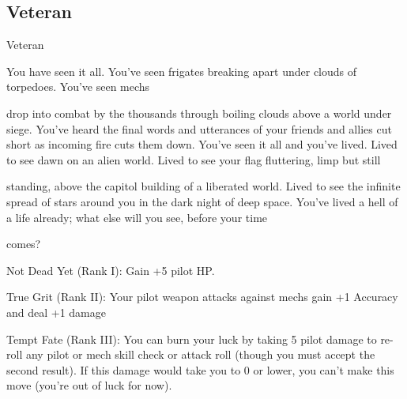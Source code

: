 \subsection{Veteran}

                                                     Veteran  

You have seen it all. You’ve seen frigates breaking apart under clouds of torpedoes. You’ve seen mechs  

drop into combat by the thousands through boiling clouds above a world under siege. You’ve heard the  
final words and utterances of your friends and allies cut short as incoming fire cuts them down. You’ve seen  
it all and you’ve lived. Lived to see dawn on an alien world. Lived to see your flag fluttering, limp but still  

standing, above the capitol building of a liberated world. Lived to see the infinite spread of stars around you  
in the dark night of deep space. You’ve lived a hell of a life already; what else will you see, before your time  

comes?    

Not Dead Yet (Rank I): Gain +5 pilot HP.
 

                                                                                                                    


True Grit (Rank II): Your pilot weapon attacks against mechs gain +1 Accuracy and deal +1  
damage
 
Tempt Fate (Rank III): You can burn your luck by taking 5 pilot damage to re-roll any pilot or  
mech skill check or attack roll (though you must accept the second result). If this damage would  
take you to 0 or lower, you can’t make this move (you’re out of luck for now).  
